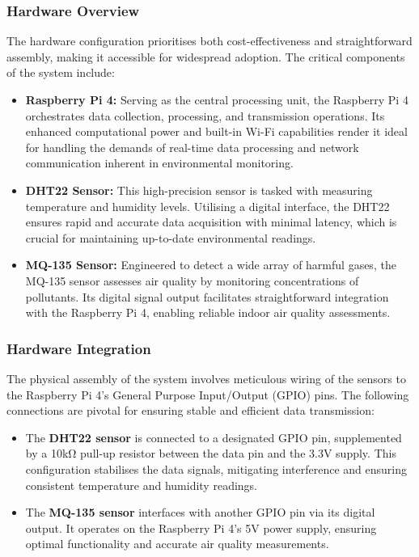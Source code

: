 \documentclass[a4paper, 12pt]{report}
\begin{document}
\subsubsection{Hardware Overview}
The hardware configuration prioritises both cost-effectiveness and straightforward assembly, making it accessible for widespread adoption. The critical components of the system include:
\begin{itemize}
    \item \textbf{Raspberry Pi 4:} Serving as the central processing unit, the Raspberry Pi 4 orchestrates data collection, processing, and transmission operations. Its enhanced computational power and built-in Wi-Fi capabilities render it ideal for handling the demands of real-time data processing and network communication inherent in environmental monitoring.
    \item \textbf{DHT22 Sensor:} This high-precision sensor is tasked with measuring temperature and humidity levels. Utilising a digital interface, the DHT22 ensures rapid and accurate data acquisition with minimal latency, which is crucial for maintaining up-to-date environmental readings.
    \item \textbf{MQ-135 Sensor:} Engineered to detect a wide array of harmful gases, the MQ-135 sensor assesses air quality by monitoring concentrations of pollutants. Its digital signal output facilitates straightforward integration with the Raspberry Pi 4, enabling reliable indoor air quality assessments.
\end{itemize}

\subsubsection{Hardware Integration}
The physical assembly of the system involves meticulous wiring of the sensors to the Raspberry Pi 4's General Purpose Input/Output (GPIO) pins. The following connections are pivotal for ensuring stable and efficient data transmission:
\begin{itemize}
    \item The \textbf{DHT22 sensor} is connected to a designated GPIO pin, supplemented by a 10kΩ pull-up resistor between the data pin and the 3.3V supply. This configuration stabilises the data signals, mitigating interference and ensuring consistent temperature and humidity readings.
    \item The \textbf{MQ-135 sensor} interfaces with another GPIO pin via its digital output. It operates on the Raspberry Pi 4's 5V power supply, ensuring optimal functionality and accurate air quality measurements.
\end{itemize}
\end{document}
